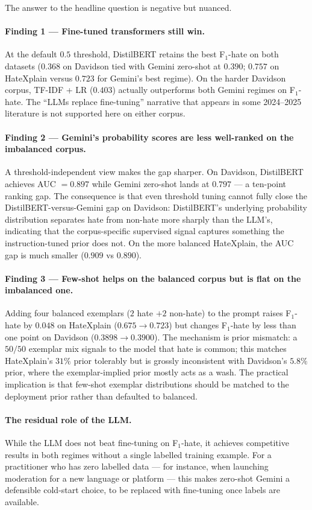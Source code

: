 \documentclass[11pt]{article}
\begin{document}


The answer to the headline question is negative but nuanced.

\paragraph{Finding 1 --- Fine-tuned transformers still win.}
At the default $0.5$ threshold, DistilBERT retains the best F$_1$-hate
on both datasets ($0.368$ on Davidson tied with Gemini zero-shot at
$0.390$; $0.757$ on HateXplain versus $0.723$ for Gemini's best
regime). On the harder Davidson corpus, TF-IDF + LR ($0.403$)
actually outperforms both Gemini regimes on F$_1$-hate. The
``LLMs replace fine-tuning'' narrative that appears in some 2024--2025
literature is not supported here on either corpus.

\paragraph{Finding 2 --- Gemini's probability scores are less
well-ranked on the imbalanced corpus.} A threshold-independent view
makes the gap sharper. On Davidson, DistilBERT achieves
AUC $= 0.897$ while Gemini zero-shot lands at $0.797$ --- a ten-point
ranking gap. The consequence is that even threshold tuning cannot
fully close the DistilBERT-versus-Gemini gap on Davidson: DistilBERT's
underlying probability distribution separates hate from non-hate more
sharply than the LLM's, indicating that the corpus-specific supervised
signal captures something the instruction-tuned prior does not. On the
more balanced HateXplain, the AUC gap is much smaller ($0.909$ vs
$0.890$).

\paragraph{Finding 3 --- Few-shot helps on the balanced corpus but is
flat on the imbalanced one.} Adding four balanced exemplars
($2$ hate $+ 2$ non-hate) to the prompt raises F$_1$-hate by
$0.048$ on HateXplain ($0.675 \to 0.723$) but changes F$_1$-hate by
less than one point on Davidson ($0.3898 \to 0.3900$). The mechanism
is prior mismatch: a $50/50$ exemplar mix signals to the model that
hate is common; this matches HateXplain's $31\%$ prior tolerably but
is grossly inconsistent with Davidson's $5.8\%$ prior, where the
exemplar-implied prior mostly acts as a wash. The practical
implication is that few-shot exemplar distributions should be
matched to the deployment prior rather than defaulted to balanced.

\paragraph{The residual role of the LLM.} While the LLM does not
beat fine-tuning on F$_1$-hate, it achieves competitive results in
both regimes without a single labelled training example. For a
practitioner who has zero labelled data --- for instance, when
launching moderation for a new language or platform --- this makes
zero-shot Gemini a defensible cold-start choice, to be replaced with
fine-tuning once labels are available.



\end{document}
